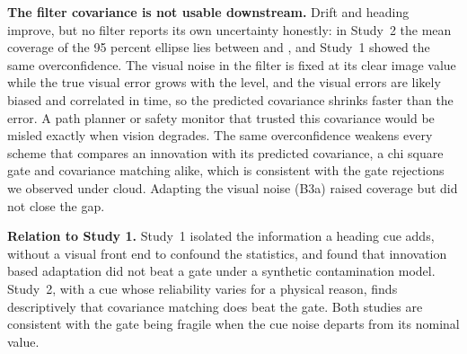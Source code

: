 \documentclass[conference]{IEEEtran}
\begin{document}
\textbf{The filter covariance is not usable downstream.} Drift and heading improve, but no filter reports its own uncertainty honestly: in Study~2 the mean coverage of the 95 percent ellipse lies between \ncvBzerothree{} and \ncvBthreeafour{}, and Study~1 showed the same overconfidence. The visual noise in the filter is fixed at its clear image value while the true visual error grows with the level, and the visual errors are likely biased and correlated in time, so the predicted covariance shrinks faster than the error. A path planner or safety monitor that trusted this covariance would be misled exactly when vision degrades. The same overconfidence weakens every scheme that compares an innovation with its predicted covariance, a chi square gate and covariance matching alike, which is consistent with the gate rejections we observed under cloud. Adapting the visual noise (B3a) raised coverage but did not close the gap.

\textbf{Relation to Study 1.} Study~1 isolated the information a heading cue adds, without a visual front end to confound the statistics, and found that innovation based adaptation did not beat a gate under a synthetic contamination model. Study~2, with a cue whose reliability varies for a physical reason, finds descriptively that covariance matching does beat the gate. Both studies are consistent with the gate being fragile when the cue noise departs from its nominal value.
\end{document}
